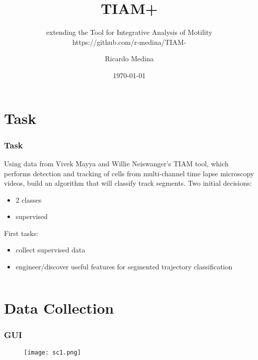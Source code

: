 \documentclass[8pt]{beamer}
\begin{document}
\title{TIAM+}
\subtitle{extending the Tool for Integrative Analysis of Motility\\ https://github.com/r-medina/TIAM-}
\author{Ricardo Medina}
\date{\today}


\frame{\titlepage}

\section{Task}
\begin{frame}
  \frametitle{Task}
  Using data from Vivek Mayya and Willie Neiswanger's TIAM tool, which
  performs detection and tracking of cells from multi-channel time
  lapse microscopy videos, build an algorithm that will classify track
  segments. Two initial decisions:
  \begin{itemize}
  \item 2 classes
  \item supervised
  \end{itemize}
  First tasks:
  \begin{itemize}
  \item collect supervised data
  \item engineer/discover useful features for segmented trajectory
    classification
  \end{itemize}
  \begin{columns}
    \begin{column}[t]{0.5\textwidth}
    \end{column}

    \begin{column}[t]{0.5\textwidth}
    \end{column}
  \end{columns}

\end{frame}

\section{Data Collection}  
\begin{frame}
  \frametitle{GUI}  
  
    \begin{figure}[H]\centering
    \texttt{[image: sc1.png]}
  \end{figure}
  
\end{frame}
\end{document}
